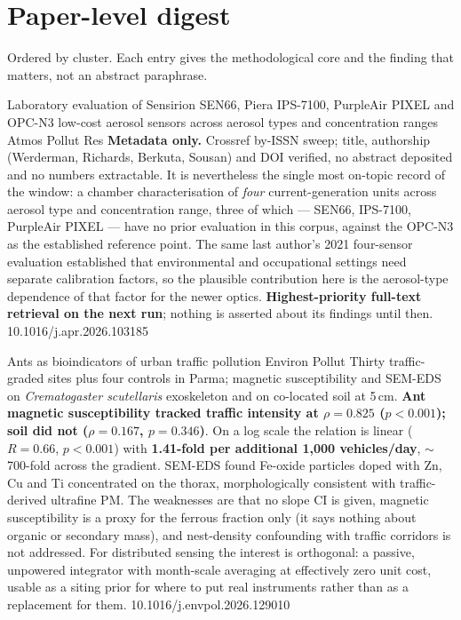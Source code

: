 \documentclass[10pt]{article}
\begin{document}
\vspace{3mm}
\section*{\sffamily\bfseries\color{Deep}Paper-level digest}
\vspace{-1.5mm}{\color{Amber}\rule{\linewidth}{1.1pt}}\vspace{1mm}

{\fontsize{7.4}{9}\selectfont\color{Slate}Ordered by cluster. Each entry gives the
methodological core and the finding that matters, not an abstract paraphrase.\par}


{Laboratory evaluation of Sensirion SEN66, Piera IPS-7100, PurpleAir PIXEL and OPC-N3 low-cost aerosol sensors across aerosol types and concentration ranges}
{Atmos Pollut Res}
{\textbf{Metadata only.} Crossref by-ISSN sweep; title, authorship (Werderman, Richards,
Berkuta, Sousan) and DOI verified, no abstract deposited and no numbers extractable. It is
nevertheless the single most on-topic record of the window: a chamber characterisation of
\emph{four} current-generation units across aerosol type and concentration range, three of
which --- SEN66, IPS-7100, PurpleAir PIXEL --- have no prior evaluation in this corpus,
against the OPC-N3 as the established reference point. The same last author's 2021
four-sensor evaluation established that environmental and occupational settings need
separate calibration factors, so the plausible contribution here is the aerosol-type
dependence of that factor for the newer optics. \textbf{Highest-priority full-text
retrieval on the next run}; nothing is asserted about its findings until then.}
{10.1016/j.apr.2026.103185}

{Ants as bioindicators of urban traffic pollution}
{Environ Pollut}
{Thirty traffic-graded sites plus four controls in Parma; magnetic susceptibility and
SEM-EDS on \textit{Crematogaster scutellaris} exoskeleton and on co-located soil at 5\,cm.
\textbf{Ant magnetic susceptibility tracked traffic intensity at $\rho = 0.825$
($p < 0.001$); soil did not ($\rho = 0.167$, $p = 0.346$)}. On a log scale the relation is
linear ($R = 0.66$, $p < 0.001$) with \textbf{1.41-fold per additional 1{,}000
vehicles/day}, $\sim$700-fold across the gradient. SEM-EDS found Fe-oxide particles doped
with Zn, Cu and Ti concentrated on the thorax, morphologically consistent with
traffic-derived ultrafine PM. The weaknesses are that no slope CI is given, magnetic
susceptibility is a proxy for the ferrous fraction only (it says nothing about organic or
secondary mass), and nest-density confounding with traffic corridors is not addressed. For
distributed sensing the interest is orthogonal: a passive, unpowered integrator with
month-scale averaging at effectively zero unit cost, usable as a siting prior for where to
put real instruments rather than as a replacement for them.}
{10.1016/j.envpol.2026.129010}
\end{document}
